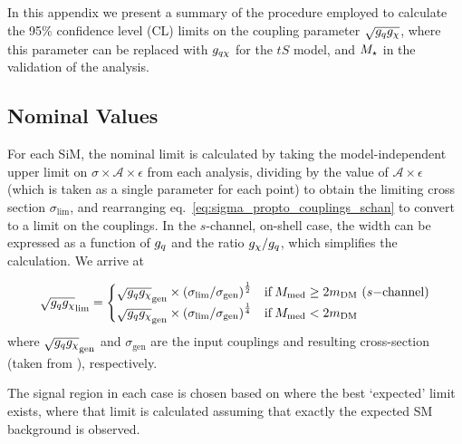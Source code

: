 In this appendix we present a summary of the procedure employed to calculate the 95\% confidence level (CL) limits on the coupling parameter $\sqrt{g_q g_{\chi}}$, where this parameter can be replaced with $g_{q \chi}$ for the $tS$ model, and $M_{\star}$ in the validation of the \monojet analysis.

\subsection{Nominal Values}
For each SiM, the nominal limit is calculated by taking the model-independent upper limit on $\sigma \times \mathcal{A} \times \epsilon$ from each analysis, dividing by the value of $\mathcal{A} \times \epsilon$ (which is taken as a single parameter for each point) to obtain the limiting cross section $\sigma_{\mathrm{lim}}$, and rearranging eq.~\ref{eq:sigma_propto_couplings_schan} to convert to a limit on the couplings. In the $s$-channel, on-shell case, the width can be expressed as a function of $g_q$ and the ratio $g_{\chi} / g_q$, which simplifies the calculation. We arrive at

\begin{equation}
  \sqrt{g_q g_{\chi}}_{\mathrm{lim}} =
  \begin{cases}
      \sqrt{g_q g_{\chi}}_{\mathrm{gen}} \times \left( \sigma_{\mathrm{lim}} / \sigma_{\mathrm{gen}} \right)^{\frac{1}{2}} & \mathrm{ if } \, M_{\mathrm{med}} \geq 2 m_{\mathrm{DM}} \,\, (s\mathrm{-channel})\\
      \sqrt{g_q g_{\chi}}_{\mathrm{gen}} \times \left( \sigma_{\mathrm{lim}} / \sigma_{\mathrm{gen}} \right)^{\frac{1}{4}} & \mathrm{ if } \, M_{\mathrm{med}} < 2 m_{\mathrm{DM}} \\
  \end{cases}
  \label{eq:nominal_limit}
\end{equation}
where $\sqrt{g_q g_{\chi}}_{\mathrm{gen}}$ and $\sigma_{\mathrm{gen}}$ are the input couplings and resulting cross-section (taken from \PYTHIA), respectively.

The signal region in each case is chosen based on where the best `expected' limit exists, where that limit is calculated assuming that exactly the expected SM background is observed.




